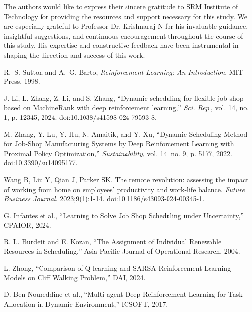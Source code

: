 \documentclass[%
aip,
cp,  %
reprint
]{revtex4-2}
\begin{document}
	\begin{acknowledgments}
		The authors would like to express their sincere gratitude to SRM Institute of
		Technology for providing the resources and support necessary for this study. We
		are especially grateful to Professor Dr. Krishnaraj N for his invaluable
		guidance, insightful suggestions, and continuous encouragement throughout the
		course of this study. His expertise and constructive feedback have been instrumental
		in shaping the direction and success of this work.
	\end{acknowledgments}
	
	
	\nocite{*}
	
	\begin{thebibliography}{99}

		
		R.~S. Sutton and A.~G. Barto, \emph{Reinforcement Learning: An Introduction}, MIT Press, 1998.
		
		J. Li, L. Zhang, Z. Li, and S. Zhang, ``Dynamic scheduling for flexible job shop based on MachineRank with deep reinforcement learning,'' \textit{Sci. Rep.}, vol. 14, no. 1, p. 12345, 2024. doi:10.1038/s41598-024-79593-8.
		
		M. Zhang, Y. Lu, Y. Hu, N. Amaitik, and Y. Xu, ``Dynamic Scheduling Method for Job-Shop Manufacturing Systems by Deep Reinforcement Learning with Proximal Policy Optimization,'' \textit{Sustainability}, vol. 14, no. 9, p. 5177, 2022. doi:10.3390/su14095177.
		
		
		
		Wang B, Liu Y, Qian J, Parker SK. The remote revolution: assessing the impact of working from home on employees' productivity and work-life balance. \textit{Future Business Journal}. 2023;9(1):1-14. doi:10.1186/s43093-024-00345-1.
		
		 G. Infantes et al., ``Learning to Solve Job Shop Scheduling
		under Uncertainty,'' CPAIOR, 2024.
		
		 R. L. Burdett and E. Kozan, ``The Assignment of
		Individual Renewable Resources in Scheduling,'' Asia Pacific Journal of
		Operational Research, 2004.
		
		 L. Zhong, ``Comparison of Q-learning and SARSA
		Reinforcement Learning Models on Cliff Walking Problem,'' DAI, 2024.
		
		 D. Ben Noureddine et al., ``Multi-agent Deep Reinforcement
		Learning for Task Allocation in Dynamic Environment,'' ICSOFT, 2017.
		

\end{thebibliography}
\end{document}
